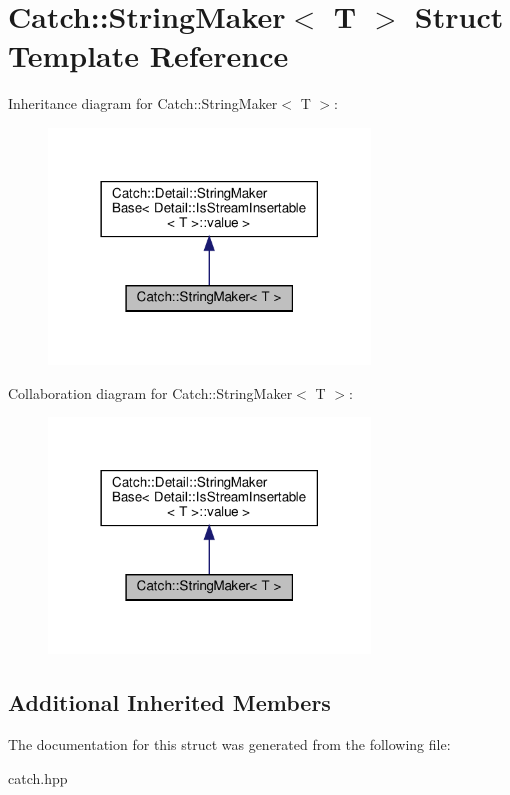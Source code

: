 \hypertarget{structCatch_1_1StringMaker}{}\section{Catch\+:\+:String\+Maker$<$ T $>$ Struct Template Reference}
\label{structCatch_1_1StringMaker}


Inheritance diagram for Catch\+:\+:String\+Maker$<$ T $>$\+:\nopagebreak
\begin{figure}[H]
\begin{center}
\leavevmode
\includegraphics[width=242pt]{structCatch_1_1StringMaker__inherit__graph}
\end{center}
\end{figure}


Collaboration diagram for Catch\+:\+:String\+Maker$<$ T $>$\+:\nopagebreak
\begin{figure}[H]
\begin{center}
\leavevmode
\includegraphics[width=242pt]{structCatch_1_1StringMaker__coll__graph}
\end{center}
\end{figure}
\subsection*{Additional Inherited Members}


The documentation for this struct was generated from the following file\+:\begin{DoxyCompactItemize}
\item 
catch.\+hpp\end{DoxyCompactItemize}
